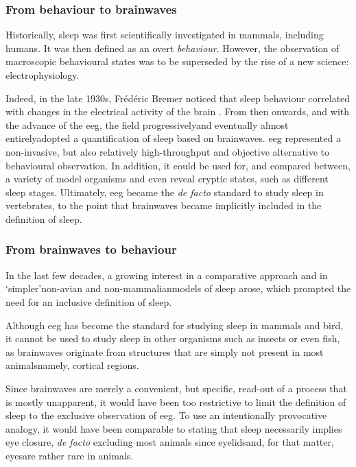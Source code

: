 \label{sec:sleep-def}
\subsubsection{From behaviour to brainwaves}
Historically, sleep was first scientifically investigated in mammals, including humans.
It was then defined as an overt \emph{behaviour}\cite{pieron1913probleme}.
However, the observation of macroscopic behavioural states was to be superseded by the rise of a new science: electrophysiology.

Indeed, in the late 1930s, Frédéric Bremer noticed that sleep behaviour correlated with changes in the electrical activity of the brain
\cite{bremer1937activite,kerkhofs_frederic_2000}.
From then onwards, and with the advance of the \gls{eeg}, the field progressively\emd{}and eventually almost entirely\emd{}adopted a quantification of sleep based on brainwaves.
\gls{eeg} represented a non-invasive, but also relatively high-throughput and objective alternative to behavioural observation.
In addition, it could be used for, and compared between, a variety of model organisms and even reveal cryptic states, such as different sleep stages\cite{moruzzi_brain_1949,swett_effects_1968,borbely_sleep_1981,sallanon_long-lasting_1989}.
Ultimately, \gls{eeg} became the \emph{de facto} standard to study sleep in vertebrates,
to the point that brainwaves became implicitly included in the definition of sleep.


\subsubsection{From brainwaves to behaviour}

In the last few decades, a growing interest in a comparative approach\cite{campbell_animal_1984,siegel_all_2008} and in `simpler'\emd{}non-avian and non-mammalian\emd{}models of 
sleep\cite{hendricks_need_2000} arose, which prompted the need for an inclusive definition of sleep. 

Although \gls{eeg} has become the standard for studying sleep in mammals and bird, it cannot be used to study sleep in other organisms such as insects or even fish, as brainwaves originate from structures that are simply not present in most animals\emd{}namely, cortical regions.

Since brainwaves are merely a convenient, but specific, read-out of a process that is mostly unapparent, it would have been too restrictive to limit the definition of sleep to the exclusive observation of \gls{eeg}.
To use an intentionally provocative analogy, it would have been comparable to stating that sleep necessarily implies eye closure, \emph{de facto} excluding most animals since eyelids\emd{}and, for that matter, eyes\emd{}are rather rare in animals.

